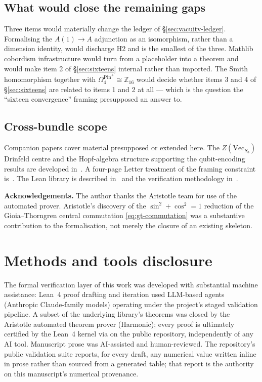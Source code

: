 \documentclass[aps,prd,reprint,nofootinbib,superscriptaddress]{revtex4-2}
\makeatletter
\DeclareRobustCommand{\texttt}[1]{%
  \skeft@origtexttt{\let\skeftunder\_\def\_{\skeftunder\allowbreak}#1}}
\makeatother
\begin{document}
\subsection{What would close the remaining gaps}

Three items would materially change the ledger of
\S\ref{sec:vacuity-ledger}. Formalising the $A(1) \to A$ adjunction as
an isomorphism, rather than a dimension identity, would discharge H2 and
is the smallest of the three. Mathlib cobordism infrastructure would
turn \texttt{dai\_freed\_spin\_z4} from a placeholder into a theorem and
would make item 2 of \S\ref{sec:sixteens} internal rather than imported.
The Smith homomorphism together with
$\Omega_4^{\mathrm{Pin}^+} \cong \mathbb{Z}_{16}$ would decide whether
items 3 and 4 of \S\ref{sec:sixteens} are related to items 1 and 2 at
all --- which is the question the ``sixteen convergence'' framing
presupposed an answer to.

\subsection{Cross-bundle scope}

Companion papers cover material presupposed or extended here. The
$Z(\mathrm{Vec}_{S_3})$ Drinfeld centre and the Hopf-algebra structure
supporting the qubit-encoding results are developed
in~\cite{Roehm2026D4}. A four-page Letter treatment of the framing
constraint is~\cite{Roehm2026L2}. The Lean library is described
in~\cite{Roehm2026I2} and the verification methodology
in~\cite{Roehm2026I1}.

\bigskip

\noindent\textbf{Acknowledgements.} The author thanks the Aristotle team
for use of the automated prover. Aristotle's discovery of the
$\sin^2 + \cos^2 = 1$ reduction of the Gioia--Thorngren central
commutation \eqref{eq:gt-commutation} was a substantive contribution to
the formalisation, not merely the closure of an existing skeleton.

\section*{Methods and tools disclosure}
The formal verification layer of this work was developed with substantial
machine assistance: Lean~4 proof drafting and iteration used LLM-based
agents (Anthropic Claude-family models) operating under the project's
staged validation pipeline. A subset of the underlying library's theorems
was closed by the Aristotle automated theorem prover (Harmonic); every
proof is ultimately certified by the Lean~4 kernel via \texttt{lake build}
on the public repository, independently of any AI tool. Manuscript prose
was AI-assisted and human-reviewed. The repository's public validation
suite reports, for every draft, any numerical value written inline in
prose rather than sourced from a generated table; that report is the
authority on this manuscript's numerical provenance.
\end{document}
